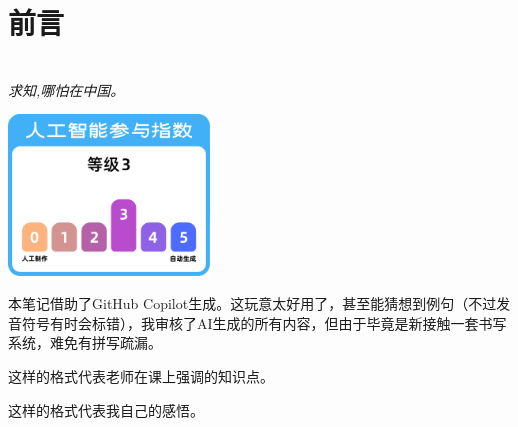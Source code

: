 \chapter*{前言}

\vfill
\begin{center}

    
    ~\\

    \emph{求知,哪怕在中国。}
\end{center}
\vfill

\begin{center}
    \begin{center}
        \includegraphics[width=0.4\textwidth]{img/iiia.pdf}
    \end{center}
\end{center}

本笔记借助了GitHub Copilot生成。这玩意太好用了，甚至能猜想到例句（不过发音符号有时会标错），我审核了AI生成的所有内容，但由于毕竟是新接触一套书写系统，难免有拼写疏漏。

\begin{attention}
    这样的格式代表老师在课上强调的知识点。
\end{attention}

\begin{note}
    这样的格式代表我自己的感悟。
\end{note}